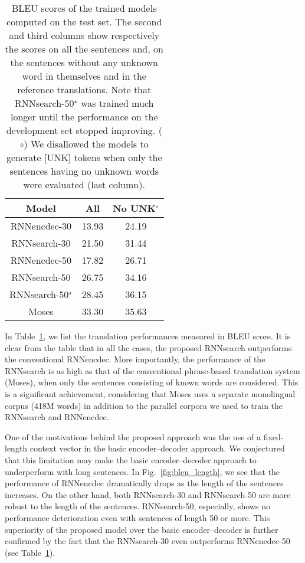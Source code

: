 \begin{table}[t]
    \centering
    \hfill
    \begin{minipage}{0.45\textwidth}
        \begin{tabular}{c|c|c}
        Model & All & No UNK$^\circ$ \\
        \hline
        \hline
        RNNencdec-30 & 13.93 & 24.19 \\
        RNNsearch-30 & 21.50 & 31.44 \\
        \hline
        RNNencdec-50 & 17.82 & 26.71 \\
        RNNsearch-50 & 26.75 & 34.16 \\
        \hline
        RNNsearch-50$^\star$ & 28.45 & 36.15 \\
        \hline
        Moses & 33.30 & 35.63
        \end{tabular}
    \end{minipage}
    \begin{minipage}[t!]{0.53\textwidth}
        \vspace{-2mm}

        \caption{BLEU scores of the trained models computed on the test set.
            The second and third columns show respectively the scores on all the
            sentences and, on the sentences without any unknown word in
            themselves and in the reference translations. Note that
            RNNsearch-50$^\star$ was trained much longer until the performance
            on the development set stopped improving.  ($\circ$) We disallowed
            the models to generate [UNK] tokens when only the sentences having
            no unknown words were evaluated (last column).  
        }
        \label{tab:bleu}
    \end{minipage}
    \hfill
\end{table}

In Table~\ref{tab:bleu}, we list the translation performances measured in BLEU
score. It is clear from the table that in all the cases, the proposed RNNsearch
outperforms the conventional RNNencdec.  More importantly, the performance of the
RNNsearch is as high as that of the conventional phrase-based translation system
(Moses), when only the sentences consisting of known words are considered. This
is a significant achievement, considering that Moses uses a separate monolingual
corpus (418M words) in addition to the parallel corpora we used to train the
RNNsearch and RNNencdec.

One of the motivations behind the proposed approach was the use of a
fixed-length context vector in the basic encoder--decoder approach. We
conjectured that this limitation may make the basic encoder--decoder approach to
underperform with long sentences. In Fig.~\ref{fig:bleu_length}, we see that the
performance of RNNencdec dramatically drops as the length of the sentences
increases. On the other hand, both RNNsearch-30 and RNNsearch-50 are more robust
to the length of the sentences. RNNsearch-50, especially, shows no performance
deterioration even with sentences of length 50 or more. This superiority of the
proposed model over the basic encoder--decoder is further confirmed by the fact
that the RNNsearch-30 even outperforms RNNencdec-50 (see Table~\ref{tab:bleu}).

